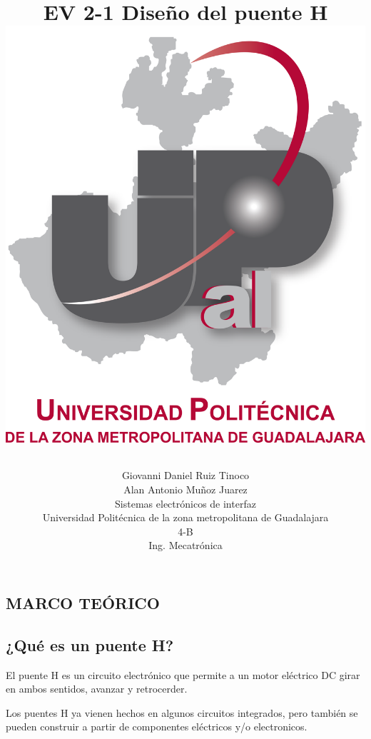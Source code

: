 \documentclass[12pt,a4paper]{article}
\title{EV 2-1 Diseño del puente H\\
\includegraphics [scale=1]{imagenes/UPZMG.png} 
\author{Giovanni Daniel Ruiz Tinoco\\
Alan Antonio Muñoz Juarez\\
\small Sistemas electrónicos de interfaz\\
  \small Universidad Politécnica de la zona metropolitana de Guadalajara\\
  \small 4-B \\
  \small Ing. Mecatrónica\\
\centering
}
}
\begin{document}
\maketitle
\newpage
\begin{center}
\section {MARCO TEÓRICO}
\end{center}
\subsection{¿Qué es un puente H?}
El puente H  es un circuito electrónico que permite a un motor eléctrico DC girar en ambos sentidos, avanzar y retrocerder.

Los puentes H ya vienen hechos en algunos circuitos integrados, pero también se pueden construir a partir de componentes eléctricos y/o electronicos.
\end{document}

